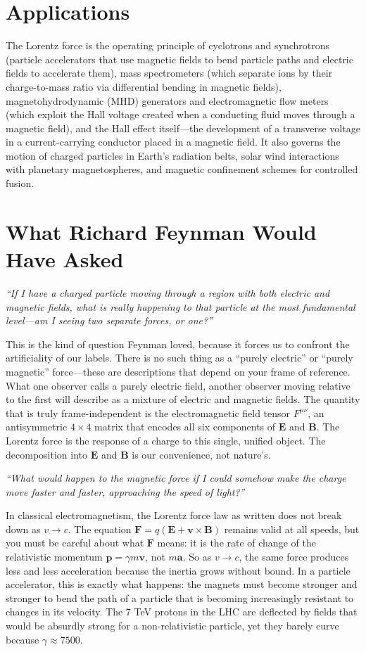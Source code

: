 \section*{Applications}

The Lorentz force is the operating principle of cyclotrons and synchrotrons (particle accelerators that use magnetic fields to bend particle paths and electric fields to accelerate them), mass spectrometers (which separate ions by their charge-to-mass ratio via differential bending in magnetic fields), magnetohydrodynamic (MHD) generators and electromagnetic flow meters (which exploit the Hall voltage created when a conducting fluid moves through a magnetic field), and the Hall effect itself---the development of a transverse voltage in a current-carrying conductor placed in a magnetic field. It also governs the motion of charged particles in Earth's radiation belts, solar wind interactions with planetary magnetospheres, and magnetic confinement schemes for controlled fusion.
\section*{What Richard Feynman Would Have Asked}

\textit{``If I have a charged particle moving through a region with both electric and magnetic fields, what is really happening to that particle at the most fundamental level---am I seeing two separate forces, or one?''}

This is the kind of question Feynman loved, because it forces us to confront the artificiality of our labels. There is no such thing as a ``purely electric'' or ``purely magnetic'' force---these are descriptions that depend on your frame of reference. What one observer calls a purely electric field, another observer moving relative to the first will describe as a mixture of electric and magnetic fields. The quantity that is truly frame-independent is the electromagnetic field tensor $F^{\mu\nu}$, an antisymmetric $4\times 4$ matrix that encodes all six components of $\mathbf{E}$ and $\mathbf{B}$. The Lorentz force is the response of a charge to this single, unified object. The decomposition into $\mathbf{E}$ and $\mathbf{B}$ is our convenience, not nature's.

\textit{``What would happen to the magnetic force if I could somehow make the charge move faster and faster, approaching the speed of light?''}

In classical electromagnetism, the Lorentz force law as written does not break down as $v\to c$. The equation $\mathbf{F} = q(\mathbf{E} + \mathbf{v}\times\mathbf{B})$ remains valid at all speeds, but you must be careful about what $\mathbf{F}$ means: it is the rate of change of the relativistic momentum $\mathbf{p} = \gamma m\mathbf{v}$, not $m\mathbf{a}$. So as $v\to c$, the same force produces less and less acceleration because the inertia grows without bound. In a particle accelerator, this is exactly what happens: the magnets must become stronger and stronger to bend the path of a particle that is becoming increasingly resistant to changes in its velocity. The 7 TeV protons in the LHC are deflected by fields that would be absurdly strong for a non-relativistic particle, yet they barely curve because $\gamma \approx 7500$.


